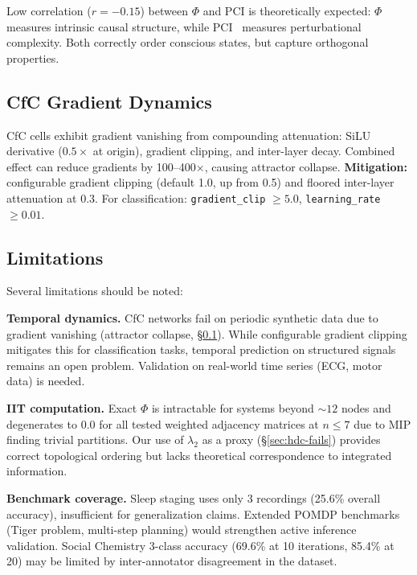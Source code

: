 \documentclass[10pt,letterpaper]{article}
\renewcommand{\Phi}{\varPhi}
\begin{document}
Low correlation ($r = -0.15$) between $\Phi$ and PCI is theoretically expected: $\Phi$~\cite{tononi2004information} measures intrinsic causal structure, while PCI~\cite{casali2013consciousness} measures perturbational complexity. Both correctly order conscious states, but capture orthogonal properties.

\subsection{CfC Gradient Dynamics}
\label{sec:cfc-gradients}

CfC cells exhibit gradient vanishing from compounding attenuation: SiLU derivative ($0.5\times$ at origin), gradient clipping, and inter-layer decay. Combined effect can reduce gradients by 100--400$\times$, causing attractor collapse. \textbf{Mitigation:} configurable gradient clipping (default 1.0, up from 0.5) and floored inter-layer attenuation at 0.3. For classification: \texttt{gradient\_clip} $\geq 5.0$, \texttt{learning\_rate} $\geq 0.01$.

\subsection{Limitations}
\label{sec:limitations}

Several limitations should be noted:

\textbf{Temporal dynamics.} CfC networks fail on periodic synthetic data due to gradient vanishing (attractor collapse, \S\ref{sec:cfc-gradients}). While configurable gradient clipping mitigates this for classification tasks, temporal prediction on structured signals remains an open problem. Validation on real-world time series (ECG, motor data) is needed.

\textbf{IIT computation.} Exact $\Phi$ is intractable for systems beyond ${\sim}12$ nodes and degenerates to 0.0 for all tested weighted adjacency matrices at $n \leq 7$ due to MIP finding trivial partitions. Our use of $\lambda_2$ as a proxy (\S\ref{sec:hdc-fails}) provides correct topological ordering but lacks theoretical correspondence to integrated information.

\textbf{Benchmark coverage.} Sleep staging uses only 3 recordings (25.6\% overall accuracy), insufficient for generalization claims. Extended POMDP benchmarks (Tiger problem, multi-step planning) would strengthen active inference validation. Social Chemistry 3-class accuracy (69.6\% at 10 iterations, 85.4\% at 20) may be limited by inter-annotator disagreement in the dataset.
\end{document}
